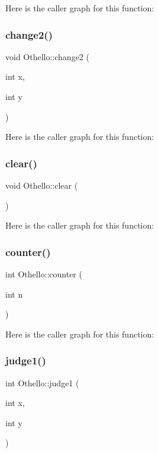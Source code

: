 Here is the caller graph for this function\+:
\hypertarget{class_othello_ad98cd8ba030a4900155b7bbe1a36de98}{}\label{class_othello_ad98cd8ba030a4900155b7bbe1a36de98} 
\subsubsection{\texorpdfstring{change2()}{change2()}}
{\footnotesize\ttfamily void Othello\+::change2 (\begin{DoxyParamCaption}\item[{int}]{x,  }\item[{int}]{y }\end{DoxyParamCaption})}

Here is the caller graph for this function\+:
\hypertarget{class_othello_ae6fcfc01ad3e23ec98cdfd5f67208cb3}{}\label{class_othello_ae6fcfc01ad3e23ec98cdfd5f67208cb3} 
\subsubsection{\texorpdfstring{clear()}{clear()}}
{\footnotesize\ttfamily void Othello\+::clear (\begin{DoxyParamCaption}{ }\end{DoxyParamCaption})}

Here is the caller graph for this function\+:
\hypertarget{class_othello_ac12d9682f956e7fedf9e120c71a35c59}{}\label{class_othello_ac12d9682f956e7fedf9e120c71a35c59} 
\subsubsection{\texorpdfstring{counter()}{counter()}}
{\footnotesize\ttfamily int Othello\+::counter (\begin{DoxyParamCaption}\item[{int}]{n }\end{DoxyParamCaption})}

Here is the caller graph for this function\+:
\hypertarget{class_othello_ae3d4f0fb9d242449b1cdf6adb0816016}{}\label{class_othello_ae3d4f0fb9d242449b1cdf6adb0816016} 
\subsubsection{\texorpdfstring{judge1()}{judge1()}}
{\footnotesize\ttfamily int Othello\+::judge1 (\begin{DoxyParamCaption}\item[{int}]{x,  }\item[{int}]{y }\end{DoxyParamCaption})}

